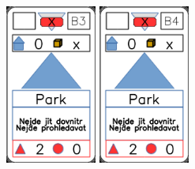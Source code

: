 \documentclass[a4paper]{article}
\begin{document}
	\includegraphics[width=3.0cm]{img-2_22}
	\includegraphics[width=3.0cm]{img-2_23}
\end{document}
